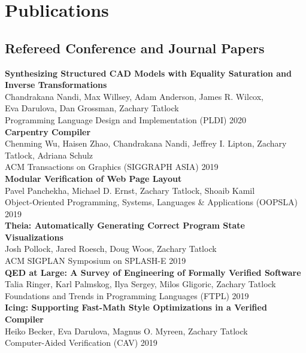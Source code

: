 \documentclass[10pt]{article}
\begin{document}
\section*{Publications}

\subsection*{Refereed Conference and Journal Papers}

\textbf{%
Synthesizing Structured CAD Models with
Equality Saturation and Inverse Transformations
} \\
Chandrakana Nandi, Max Willsey, Adam Anderson, James R. Wilcox, \\
Eva Darulova, Dan Grossman, Zachary Tatlock \\
Programming Language Design and Implementation (PLDI) 2020 \\

\textbf{%
Carpentry Compiler
} \\
Chenming Wu, Haisen Zhao, Chandrakana Nandi, Jeffrey I. Lipton, Zachary Tatlock, Adriana Schulz \\
ACM Transactions on Graphics (SIGGRAPH ASIA) 2019 \\

\textbf{%
Modular Verification of Web Page Layout
} \\
Pavel Panchekha, Michael D. Ernst, Zachary Tatlock, Shoaib Kamil \\
Object-Oriented Programming, Systems, Languages \& Applications (OOPSLA) 2019 \\

\textbf{%
Theia: Automatically Generating Correct Program State Visualizations
} \\
Josh Pollock, Jared Roesch, Doug Woos, Zachary Tatlock \\
ACM SIGPLAN Symposium on SPLASH-E 2019 \\

\textbf{%
QED at Large: A Survey of Engineering of Formally Verified Software
} \\
Talia Ringer, Karl Palmskog, Ilya Sergey, Milos Gligoric, Zachary Tatlock \\
Foundations and Trends in Programming Languages (FTPL) 2019 \\

\textbf{%
Icing: Supporting Fast-Math Style Optimizations in a Verified Compiler
} \\
Heiko Becker, Eva Darulova, Magnus O. Myreen, Zachary Tatlock \\
Computer-Aided Verification (CAV) 2019 \\
\end{document}
